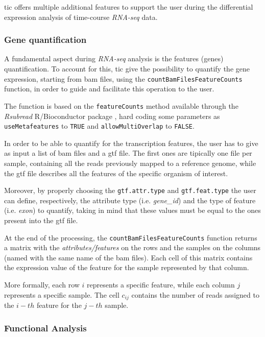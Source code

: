 \gls{tic} offers multiple additional features to support the user during the differential expression analysis of time-course \textit{RNA-seq} data.

\subsubsection{Gene quantification}

A fundamental aspect during \textit{RNA-seq} analysis is the features (genes) quantification.
To account for this, \gls{tic} give the possibility to quantify the gene expression, starting from \gls{bam} files, using the \lstinline!countBamFilesFeatureCounts! function, in order to guide and facilitate this operation to the user.

The function is based on the \lstinline!featureCounts! method available through the \textit{Rsubread} R/Bioconductor package \cite{Liao2013}, hard coding some parameters as \lstinline!useMetafeatures! to \lstinline!TRUE! and \lstinline!allowMultiOverlap! to \lstinline!FALSE!.

In order to be able to quantify for the transcription features, the user has to give as input a list of \gls{bam} files and a \gls{gtf} file.
The first ones are tipically one file per sample, containing all the reads previously mapped to a reference genome, while the \gls{gtf} file describes all the features of the specific organism of interest. 

Moreover, by properly choosing  the \lstinline!gtf.attr.type! and \lstinline!gtf.feat.type! the user can define, respectively, the attribute type (i.e. \textit{gene\_id}) and the type of feature (i.e. \textit{exon}) to quantify, taking in mind that these values must be equal to the ones present into the \gls{gtf} file.

At the end of the processing, the \lstinline!countBamFilesFeatureCounts! function returns a matrix with the \textit{attributes/features} on the rows and the samples  on the columns (named with the same name of the \gls{bam} files).
Each cell of this matrix contains the expression value of the feature for the sample represented by that column.

More formally, each row $i$ represents a specific feature, while each column $j$ represents a specific sample.
The cell $c_{ij}$ contains the number of reads assigned to the $i-th$ feature for the $j-th$ sample.

\subsubsection{Functional Analysis}

